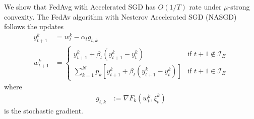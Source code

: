 We show that FedAvg with Accelerated SGD has $O(1/T)$ rate under
$\mu$-strong convexity. The FedAv algorithm with Nesterov Accelerated
SGD (NASGD) follows the updates
\begin{align*}
y_{t+1}^{k} & =w_{t}^{k}-\alpha_{t}g_{t,k}\\
w_{t+1}^{k} & =\begin{cases}
y_{t+1}^{k}+\beta_{t}(y_{t+1}^{k}-y_{t}^{k}) & \text{if }t+1\notin\mathcal{I}_{E}\\
\sum_{k=1}^{N}p_{k}\left[y_{t+1}^{k}+\beta_{t}(y_{t+1}^{k}-y_{t}^{k})\right] & \text{if }t+1\in\mathcal{I}_{E}
\end{cases}
\end{align*}
where 
\begin{align*}
g_{t,k} & :=\nabla F_{k}(w_{t}^{k},\xi_{t}^{k})
\end{align*}
is the stochastic gradient. 

